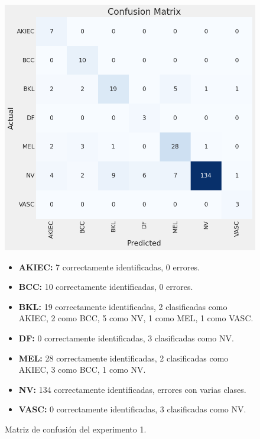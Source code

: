 \begin{figure}[H]
   \begin{minipage}{0.45\textwidth}
       \centering
       \includegraphics[width=\linewidth]{./Graphics/confussionmatrix_p1.png}
       \caption{Matriz de confusión del experimento 1.}
       \label{fig:confussion_matrix}
   \end{minipage}%
   \begin{minipage}{0.55\textwidth} 
      \small
       \begin{itemize}
           \item \textbf{AKIEC:} 7 correctamente identificadas, 0 errores.
           \item \textbf{BCC:} 10 correctamente identificadas, 0 errores.
           \item \textbf{BKL:} 19 correctamente identificadas, 2 clasificadas como AKIEC, 2 como BCC, 5 como NV, 1 como MEL, 1 como VASC.
           \item \textbf{DF:} 0 correctamente identificadas, 3 clasificadas como NV.
           \item \textbf{MEL:} 28 correctamente identificadas, 2 clasificadas como AKIEC, 3 como BCC, 1 como NV.
           \item \textbf{NV:} 134 correctamente identificadas, errores con varias clases.
           \item \textbf{VASC:} 0 correctamente identificadas, 3 clasificadas como NV.
       \end{itemize}
   \end{minipage}
\end{figure}

